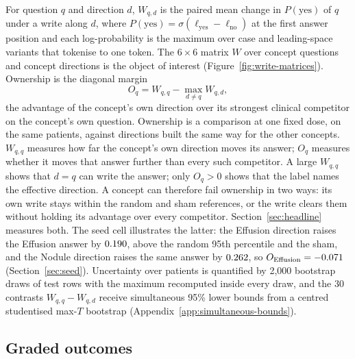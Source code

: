 \documentclass{article}
\begin{document}
For question $q$ and direction $d$, $W_{q,d}$ is the paired mean change in $P(\mathrm{yes})$ of $q$ under a write along $d$, where $P(\mathrm{yes})=\sigma(\ell_{\mathrm{yes}}-\ell_{\mathrm{no}})$ at the first answer position and each log-probability is the maximum over case and leading-space variants that tokenise to one token. The $6\times6$ matrix $W$ over concept questions and concept directions is the object of interest (Figure~\ref{fig:write-matrices}). Ownership is the diagonal margin
\begin{equation}
O_q=W_{q,q}-\max_{d\neq q}W_{q,d},
\label{eq:margin}
\end{equation}
the advantage of the concept's own direction over its strongest clinical competitor on the concept's own question. Ownership is a comparison at one fixed dose, on the same patients, against directions built the same way for the other concepts. $W_{q,q}$ measures how far the concept's own direction moves its answer; $O_q$ measures whether it moves that answer further than every such competitor. A large $W_{q,q}$ shows that $d=q$ can write the answer; only $O_q>0$ shows that the label names the effective direction. A concept can therefore fail ownership in two ways: its own write stays within the random and sham references, or the write clears them without holding its advantage over every competitor. Section~\ref{sec:headline} measures both. The seed cell illustrates the latter: the Effusion direction raises the Effusion answer by $0.190$, above the random 95th percentile and the sham, and the Nodule direction raises the same answer by $0.262$, so $O_{\mathrm{Effusion}}=-0.071$ (Section~\ref{sec:seed}). Uncertainty over patients is quantified by 2{,}000 bootstrap draws of test rows with the maximum recomputed inside every draw, and the 30 contrasts $W_{q,q}-W_{q,d}$ receive simultaneous 95\% lower bounds from a centred studentised max-$T$ bootstrap (Appendix~\ref{app:simultaneous-bounds}).

\subsection{Graded outcomes}
\label{sec:grades}
\end{document}
